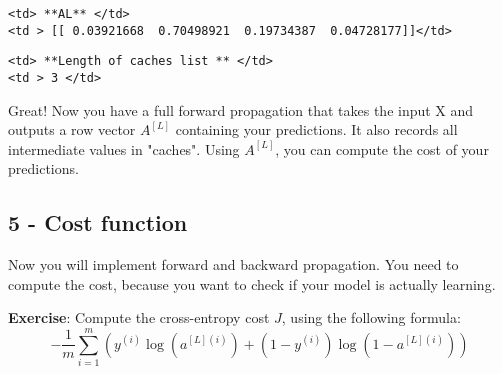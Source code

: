 \documentclass[11pt]{article}
\begin{document}
    \begin{verbatim}
<td> **AL** </td>
<td > [[ 0.03921668  0.70498921  0.19734387  0.04728177]]</td> 
\end{verbatim}

\begin{verbatim}
<td> **Length of caches list ** </td>
<td > 3 </td> 
\end{verbatim}

    Great! Now you have a full forward propagation that takes the input X
and outputs a row vector \(A^{[L]}\) containing your predictions. It
also records all intermediate values in "caches". Using \(A^{[L]}\), you
can compute the cost of your predictions.

    \subsection{5 - Cost function}\label{cost-function}

Now you will implement forward and backward propagation. You need to
compute the cost, because you want to check if your model is actually
learning.

\textbf{Exercise}: Compute the cross-entropy cost \(J\), using the
following formula:
\[-\frac{1}{m} \sum\limits_{i = 1}^{m} (y^{(i)}\log\left(a^{[L] (i)}\right) + (1-y^{(i)})\log\left(1- a^{[L](i)}\right)) \tag{7}\]
\end{document}
